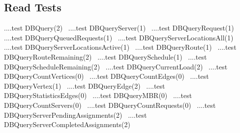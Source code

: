 \documentclass{article}
\theoremstyle{definition}
\begin{document}
\subsection{Read Tests}
\label{sec:read-tests}
\nwenddocs{}\endmoddef{}
\LA{}....test \code{}DBQuery\edoc{}(2)~{\nwtagstyle{}}\RA{}
\LA{}....test \code{}DBQueryServer\edoc{}(1)~{\nwtagstyle{}}\RA{}
\LA{}....test \code{}DBQueryRequest\edoc{}(1)~{\nwtagstyle{}}\RA{}
\LA{}....test \code{}DBQueryQueuedRequests\edoc{}(1)~{\nwtagstyle{}}\RA{}
\LA{}....test \code{}DBQueryServerLocationsAll\edoc{}(1)~{\nwtagstyle{}}\RA{}
\LA{}....test \code{}DBQueryServerLocationsActive\edoc{}(1)~{\nwtagstyle{}}\RA{}
\LA{}....test \code{}DBQueryRoute\edoc{}(1)~{\nwtagstyle{}}\RA{}
\LA{}....test \code{}DBQueryRouteRemaining\edoc{}(2)~{\nwtagstyle{}}\RA{}
\LA{}....test \code{}DBQuerySchedule\edoc{}(1)~{\nwtagstyle{}}\RA{}
\LA{}....test \code{}DBQueryScheduleRemaining\edoc{}(2)~{\nwtagstyle{}}\RA{}
\LA{}....test \code{}DBQueryCurrentLoad\edoc{}(2)~{\nwtagstyle{}}\RA{}
\LA{}....test \code{}DBQueryCountVertices\edoc{}(0)~{\nwtagstyle{}}\RA{}
\LA{}....test \code{}DBQueryCountEdges\edoc{}(0)~{\nwtagstyle{}}\RA{}
\LA{}....test \code{}DBQueryVertex\edoc{}(1)~{\nwtagstyle{}}\RA{}
\LA{}....test \code{}DBQueryEdge\edoc{}(2)~{\nwtagstyle{}}\RA{}
\LA{}....test \code{}DBQueryStatisticsEdges\edoc{}(0)~{\nwtagstyle{}}\RA{}
\LA{}....test \code{}DBQueryMBR\edoc{}(0)~{\nwtagstyle{}}\RA{}
\LA{}....test \code{}DBQueryCountServers\edoc{}(0)~{\nwtagstyle{}}\RA{}
\LA{}....test \code{}DBQueryCountRequests\edoc{}(0)~{\nwtagstyle{}}\RA{}
\LA{}....test \code{}DBQueryServerPendingAssignments\edoc{}(2)~{\nwtagstyle{}}\RA{}
\LA{}....test \code{}DBQueryServerCompletedAssignments\edoc{}(2)~{\nwtagstyle{}}\RA{}
\end{document}
